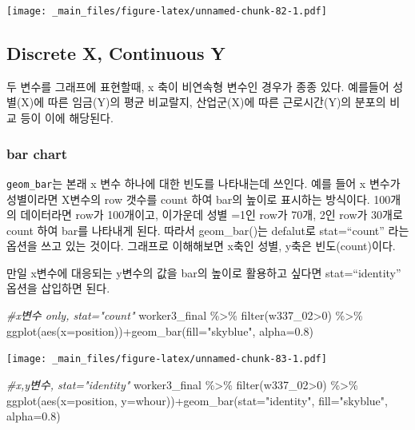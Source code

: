 \documentclass[
]{book}
\newenvironment{Shaded}{\begin{snugshade}}{\end{snugshade}}
\newcommand{\AttributeTok}[1]{\textcolor[rgb]{0.77,0.63,0.00}{#1}}
\newcommand{\CommentTok}[1]{\textcolor[rgb]{0.56,0.35,0.01}{\textit{#1}}}
\newcommand{\DecValTok}[1]{\textcolor[rgb]{0.00,0.00,0.81}{#1}}
\newcommand{\FloatTok}[1]{\textcolor[rgb]{0.00,0.00,0.81}{#1}}
\newcommand{\FunctionTok}[1]{\textcolor[rgb]{0.00,0.00,0.00}{#1}}
\newcommand{\NormalTok}[1]{#1}
\newcommand{\SpecialCharTok}[1]{\textcolor[rgb]{0.00,0.00,0.00}{#1}}
\newcommand{\StringTok}[1]{\textcolor[rgb]{0.31,0.60,0.02}{#1}}
\theoremstyle{definition}
\theoremstyle{definition}
\theoremstyle{definition}
\theoremstyle{definition}
\theoremstyle{remark}
\begin{document}
\texttt{[image: \_main\_files/figure-latex/unnamed-chunk-82-1.pdf]}

\hypertarget{discrete-x-continuous-y}{%
\subsection{Discrete X, Continuous Y}\label{discrete-x-continuous-y}}

두 변수를 그래프에 표현할때, x 축이 비연속형 변수인 경우가 종종 있다. 예를들어 성별(X)에 따른 임금(Y)의 평균 비교랄지, 산업군(X)에 따른 근로시간(Y)의 분포의 비교 등이 이에 해당된다.

\hypertarget{bar-chart}{%
\subsubsection{bar chart}\label{bar-chart}}

\texttt{geom\_bar}는 본래 x 변수 하나에 대한 빈도를 나타내는데 쓰인다. 예를 들어 x 변수가 성별이라면 X변수의 row 갯수를 count 하여 bar의 높이로 표시하는 방식이다. 100개의 데이터라면 row가 100개이고, 이가운데 성별 =1인 row가 70개, 2인 row가 30개로 count 하여 bar를 나타내게 된다. 따라서 geom\_bar()는 defalut로 stat=``count'' 라는 옵션을 쓰고 있는 것이다. 그래프로 이해해보면 x축인 성별, y축은 빈도(count)이다.

만일 x변수에 대응되는 y변수의 값을 bar의 높이로 활용하고 싶다면 stat=``identity'' 옵션을 삽입하면 된다.

\begin{Shaded}
\begin{Highlighting}[]
\CommentTok{\#x변수 only, stat="count"}
\NormalTok{worker3\_final }\SpecialCharTok{\%\textgreater{}\%} 
  \FunctionTok{filter}\NormalTok{(w337\_02}\SpecialCharTok{\textgreater{}}\DecValTok{0}\NormalTok{) }\SpecialCharTok{\%\textgreater{}\%} 
  \FunctionTok{ggplot}\NormalTok{(}\FunctionTok{aes}\NormalTok{(}\AttributeTok{x=}\NormalTok{position))}\SpecialCharTok{+}\FunctionTok{geom\_bar}\NormalTok{(}\AttributeTok{fill=}\StringTok{"skyblue"}\NormalTok{, }\AttributeTok{alpha=}\FloatTok{0.8}\NormalTok{)}
\end{Highlighting}
\end{Shaded}

\texttt{[image: \_main\_files/figure-latex/unnamed-chunk-83-1.pdf]}

\begin{Shaded}
\begin{Highlighting}[]

\CommentTok{\#x,y변수, stat="identity"}
\NormalTok{worker3\_final }\SpecialCharTok{\%\textgreater{}\%} 
  \FunctionTok{filter}\NormalTok{(w337\_02}\SpecialCharTok{\textgreater{}}\DecValTok{0}\NormalTok{) }\SpecialCharTok{\%\textgreater{}\%} 
  \FunctionTok{ggplot}\NormalTok{(}\FunctionTok{aes}\NormalTok{(}\AttributeTok{x=}\NormalTok{position, }\AttributeTok{y=}\NormalTok{whour))}\SpecialCharTok{+}\FunctionTok{geom\_bar}\NormalTok{(}\AttributeTok{stat=}\StringTok{"identity"}\NormalTok{, }\AttributeTok{fill=}\StringTok{"skyblue"}\NormalTok{, }\AttributeTok{alpha=}\FloatTok{0.8}\NormalTok{)}
\end{Highlighting}
\end{Shaded}
\end{document}
